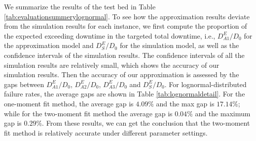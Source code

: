 \documentclass[preprint,12pt]{elsarticle}
\begin{document}

We summarize the results of the test bed in Table \ref{tab:evaluationsummerylognormal}. To see how the approximation results deviate from the simulation results for each instance, we first compute the proportion of the expected exceeding downtime in the targeted total downtime, i.e., $D_{A1}^{E}/D_0$ for the approximation model and $D_{S}^{E}/D_0$ for the simulation model, as well as the confidence intervals of the simulation results. The confidence intervals of all the simulation results are relatively small, which shows the accuracy of our simulation results. Then the accuracy of our approximation is assessed by the gaps between $D_{A1}^{E}/D_0$, $D_{A2}^{E}/D_0$, $D_{A3}^{E}/D_0$ and $D_{S}^{E}/D_0$. For lognormal-distributed failure rates, the average gaps are shown in Table \ref{tab:lognormaldetail}. For the one-moment fit method, the average gap is $4.09\%$ and the max gap is $17.14\%$; while for the two-moment fit method the average gap is $0.04\%$ and the maximum gap is $0.29\%$. From these results, we can get the conclusion that the two-moment fit method is relatively accurate under different parameter settings. %
\end{document}
